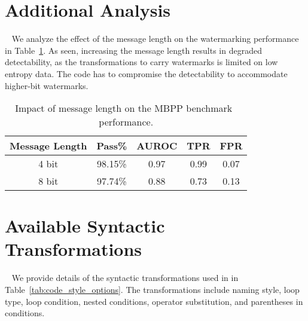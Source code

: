 \newpage
\appendix
\onecolumn

\section{Additional Analysis}~\label{ap:analysis}
We analyze the effect of the message length on the watermarking performance in Table~\ref{tab:length}. As seen, increasing the message length results in degraded detectability, as the transformations to carry watermarks is limited on low entropy data. The code has to compromise the detectability to accommodate higher-bit watermarks. 

\begin{table}[!ht]
    \centering
    \small
    \vspace{-5pt}
    \begin{tabular}{c|c c c c}
    \toprule
       Message Length  &  Pass\% & AUROC & TPR & FPR \\ \hline
        4 bit & 98.15\% & 0.97 & 0.99 & 0.07\\
        8 bit & 97.74\% & 0.88 &  0.73 & 0.13\\
    \bottomrule
    \end{tabular}
    \vspace{-5pt}
    \caption{Impact of message length on the MBPP benchmark~\cite{austin2021program} performance.}
    \vspace{-10pt}
    \label{tab:length}
\end{table}

\section{Available Syntactic Transformations}~\label{ap:trans}
We provide details of the syntactic transformations used in \sys{} in Table~\ref{tab:code_style_options}. The transformations include naming style, loop type, loop condition, nested conditions, operator substitution, and parentheses in conditions. 

